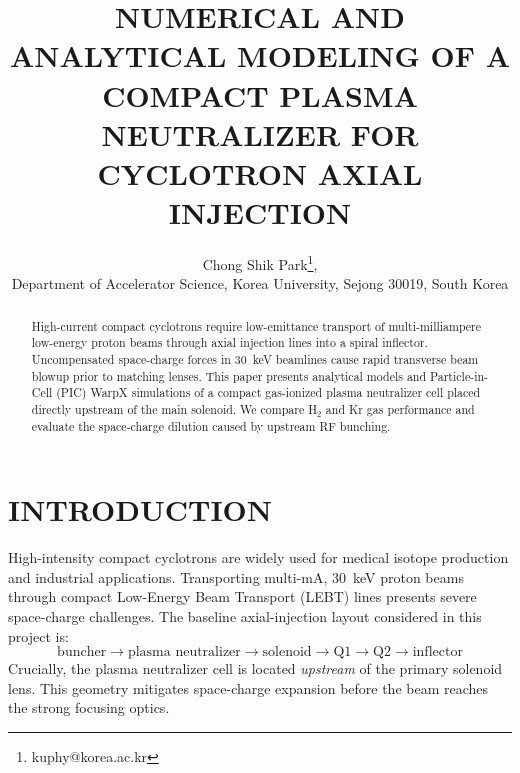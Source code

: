 \documentclass[banner]{jacow}
\begin{document}
\title{NUMERICAL AND ANALYTICAL MODELING OF A COMPACT PLASMA NEUTRALIZER FOR CYCLOTRON AXIAL INJECTION}

\author{Chong Shik Park\thanks{kuphy@korea.ac.kr},\\
Department of Accelerator Science, Korea University, Sejong 30019, South Korea}

\maketitle

\begin{abstract}
High-current compact cyclotrons require low-emittance transport of multi-milliampere low-energy proton beams through axial injection lines into a spiral inflector. Uncompensated space-charge forces in 30~keV beamlines cause rapid transverse beam blowup prior to matching lenses. This paper presents analytical models and Particle-in-Cell (PIC) WarpX simulations of a compact gas-ionized plasma neutralizer cell placed directly upstream of the main solenoid. We compare H$_2$ and Kr gas performance and evaluate the space-charge dilution caused by upstream RF bunching.
\end{abstract}

\section{INTRODUCTION}

High-intensity compact cyclotrons are widely used for medical isotope production and industrial applications. Transporting multi-mA, 30~keV proton beams through compact Low-Energy Beam Transport (LEBT) lines presents severe space-charge challenges. The baseline axial-injection layout considered in this project is:
\begin{equation}
\text{buncher} \rightarrow \text{plasma neutralizer} \rightarrow \text{solenoid} \rightarrow \text{Q1} \rightarrow \text{Q2} \rightarrow \text{inflector}
\end{equation}
Crucially, the plasma neutralizer cell is located \emph{upstream} of the primary solenoid lens. This geometry mitigates space-charge expansion before the beam reaches the strong focusing optics.
\end{document}
